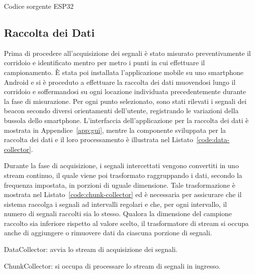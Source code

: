 \begin{listing}[H]
	\caption{Codice sorgente ESP32}
	\label{code:esp32}
\end{listing}

\subsection{Raccolta dei Dati}
Prima di procedere all'acquisizione dei segnali è stato misurato
preventivamente il corridoio e identificato mentro per metro i punti in cui
effettuare il campionamento. È stata poi installata l'applicazione mobile su
uno smartphone Android e si è proceduto a effettuare la raccolta dei dati
muovendosi lungo il corridoio e soffermandosi su ogni locazione individuata
precedentemente durante la fase di misurazione. Per ogni punto selezionato,
sono stati rilevati i segnali dei beacon secondo diversi orientamenti
dell'utente, registrando le variazioni della bussola dello smartphone.
L'interfaccia dell'applicazione per la raccolta dei dati è mostrata in
Appendice~\ref{app:gui}, mentre la componente sviluppata per la raccolta dei
dati e il loro processamento è illustrata nel
Listato~\ref{code:data-collector}. 

Durante la fase di acquisizione, i segnali intercettati vengono convertiti in
uno stream continuo, il quale viene poi trasformato raggruppando i dati,
secondo la frequenza impostata, in porzioni di uguale dimensione. Tale
trasformazione è mostrata nel Listato~\ref{code:chunk-collector} ed è
necessaria per assicurare che il sistema raccolga i segnali ad intervalli
regolari e che, per ogni intervallo, il numero di segnali raccolti sia lo
stesso. Qualora la dimensione del campione raccolto sia inferiore rispetto al
valore scelto, il trasformatore di stream si occupa anche di aggiungere o
rimuovere dati da ciascuna porzione di segnali.

\begin{listing}[htp]
	\caption{DataCollector: avvia lo stream di acquisizione dei segnali.}
  \label{code:data-collector}
\end{listing}

\begin{listing}[htp]
	\caption{ChunkCollector: si occupa di processare lo stream di segnali in
    ingresso.}
  \label{code:chunk-collector}
\end{listing}

